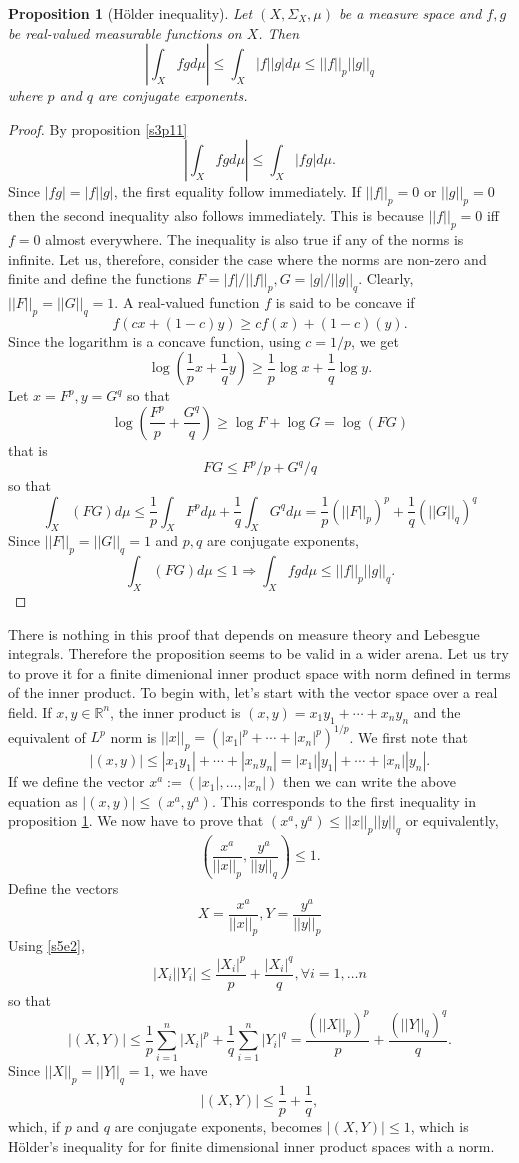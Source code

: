 \documentclass{article}
\newcommand{\sor}{\mathbb{R}}
\theoremstyle{plain}
\numberwithin{thm}{section}
\theoremstyle{plain}
\newtheorem{prop}{Proposition}
\numberwithin{prop}{section}
\theoremstyle{definition}
\numberwithin{defn}{section}
\theoremstyle{remark}
\theoremstyle{plain}
\numberwithin{cor}{section}
\numberwithin{equation}{section}
\begin{document}
\begin{prop}[H\"{o}lder inequality]\label{s5p1}
Let $(X, \Sigma_X, \mu)$ be a measure space and $f, g$ be real-valued
measurable functions on $X$. Then 
\[
\left|\int_X fgd\mu\right| \le \int_X |f||g| d\mu \le ||f||_p||g||_q
\]
where $p$ and $q$ are conjugate exponents.
\end{prop}
\begin{proof}
By proposition \ref{s3p11}
\[
\left|\int_X fg d\mu\right| \le \int_X |fg| d\mu.
\]
Since $|fg| = |f||g|$, the first equality follow immediately. If $||f||_p
= 0$ or $||g||_p = 0$ then the second inequality also follows immediately.
This is because $||f||_p = 0$ iff $f = 0$ almost everywhere. The
inequality is also true if any of the norms is infinite. Let us, therefore,
consider the case where the norms are non-zero and finite and define the
functions $F = |f|/||f||_p, G = |g|/||g||_q$. Clearly, $||F||_p = ||G||_q
= 1$.  A real-valued function $f$ is said to be concave if 
\[
f(cx + (1 - c)y) \ge cf(x) + (1 - c)(y).
\]
Since the logarithm is a concave function, using $c = 1/p$, we get
\[
\log\left(\frac{1}{p}x + \frac{1}{q}y\right) \ge \frac{1}{p}\log x +
\frac{1}{q}\log y.
\]
Let $x = F^p, y = G^q$ so that
\[
\log\left(\frac{F^p}{p} + \frac{G^q}{q}\right) \ge \log F + \log G
= \log (FG)
\]
that is 
\begin{equation}\label{s5e2}
FG \le F^p/p + G^q/q
\end{equation}
so that
\[
\int_X (FG) d\mu \le \frac{1}{p}\int_X F^p d\mu + \frac{1}{q}\int_X G^q
d\mu = \frac{1}{p}(||F||_p)^p + \frac{1}{q}(||G||_q)^q
\]
Since $||F||_p = ||G||_q = 1$ and $p, q$ are conjugate exponents,
\[
\int_X (FG) d\mu \le 1 \Rightarrow \int_X fg d\mu \le ||f||_p ||g||_q.
\]
\end{proof}

There is nothing in this proof that depends on measure theory and Lebesgue
integrals. Therefore the proposition seems to be valid in a wider arena. Let us
try to prove it for a finite dimenional inner product space with norm defined in
terms of the inner product. To begin with, let's start with the vector space 
over a real field. If $x, y \in \sor^n$, the inner product is $(x, y) = x_1y_1
+ \cdots + x_ny_n$ and the equivalent of $L^p$ norm is $||x||_p = (|x_1|^p + 
\cdots + |x_n|^p)^{1/p}$. We first note that
\[
|(x, y)| \le |x_1y_1| + \cdots + |x_ny_n| = |x_1||y_1| + \cdots + |x_n||y_n|.
\]
If we define the vector $x^a := (|x_1|, \ldots, |x_n|)$ then we can write the 
above equation as $|(x, y)| \le (x^a, y^a)$. This corresponds to the first 
inequality in proposition \ref{s5p1}. We now have to prove that $(x^a, y^a) \le
||x||_p||y||_q$ or equivalently,
\[
\left(\frac{x^a}{||x||_p}, \frac{y^a}{||y||_q}\right) \le 1.
\]
Define the vectors
\[
X = \frac{x^a}{||x||_p}, Y = \frac{y^a}{||y||_p}
\]
Using \eqref{s5e2},
\[
|X_i||Y_i| \le \frac{|X_i|^p}{p} + \frac{|X_i|^q}{q}, \forall i = 1, \ldots n
\]
so that
\[
|(X, Y)| \le \frac{1}{p}\sum_{i=1}^n |X_i|^p + \frac{1}{q}\sum_{i=1}^n |Y_i|^q
= \frac{(||X||_p)^p}{p} + \frac{(||Y||_q)^q}{q}.
\]
Since $||X||_p = ||Y||_q = 1$, we have
\[
|(X, Y)| \le \frac{1}{p} + \frac{1}{q},
\]
which, if $p$ and $q$ are conjugate exponents, becomes $|(X, Y)| \le 1$, which
is H\"{o}lder's inequality for for finite dimensional inner product spaces with
a norm.
\end{document}
